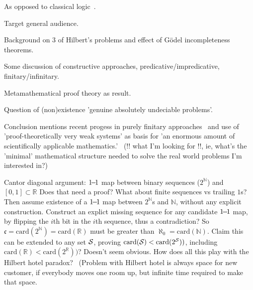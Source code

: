 \cite{Feferman:2000,Diez:2002,sep:mathematics_constructive,
wiki:Constructivism_philosophy_of_mathematics}

As opposed to classical logic~\cite{wiki:Classical_logic}.

\label{sec:Feferman}
\cite{Feferman1998LightOfLogic,Feferman:2000}


\label{sec:Deciding_the_undecidable}

\cite[ch.~1 ``Deciding the undecidable'']{Feferman1998LightOfLogic}

Target general audience.

Background on $3$ of Hilbert's problems
and effect of G\"{o}del incompleteness theorems.

Some discussion of constructive approaches, 
predicative/impredicative, finitary/infinitary.

Metamathematical proof theory as result.

Question of (non)existence 
'genuine absolutely undeciable problems'.

Conclusion mentions recent progess
in purely finitary approaches~\cite[ch.~10]{Feferman1998LightOfLogic}
and 
use of 'proof-theoretically very weak systems'
as basis for 'an enormous amount of scientifically applicable
mathematics.'~\cite[ch.~14]{Feferman1998LightOfLogic}
(!! what I'm looking for !!, ie, 
what's the 'minimal' mathematical structure needed to
solve the real world problems I'm interested in?)

\label{sec:Is_Cantor_Necessary}
\cite{Feferman1989CantorNecessary}
Cantor diagonal argument:
\hfill\break
$1{\!}{-}{\!}1$ map between binary sequences ($2^{\mathbb{N}}$)
and $[0,1]\subset\mathbb{R}$
Does that need a proof?
What about finite sequences vs trailing $1$s? 
\hfill\break
Then assume existence of a $1{\!}{-}{\!}1$  
map between $2^{\mathbb{N}}$s 
and $\mathbb{N}$,
without any explicit construction.
Construct an explict missing sequence 
for any candidate $1{\!}{-}{\!}1$ map,
by flipping the $i$th bit in the $i$th sequence,
thus a contradiction?
So $\mathfrak{c} = \mathrm{card}(2^{\mathbb{N}}) 
= \mathrm{card}(\mathbb{R})$ must be greater than 
$\aleph_0 = \mathrm{card}(\mathbb{N})$. 
\hfill\break
Claim this can be extended to any set $\mathcal{S}$,
proving $\mathrm{card}(\mathcal{S}) < \mathrm{card}(2^{\mathcal{S}}))$,
including $\mathrm{card}(\mathbb{R}) < \mathrm{card}(2^{\mathbb{R}}))$?
Doesn't seem obvious.
\hfill\break
How does all this play with 
the Hilbert hotel paradox?~\cite{wiki:Hilbert_hotel}
(Problem with Hilbert hotel is 
always space for new customer, if everybody moves one room up,
but infinite time required to make that space.

